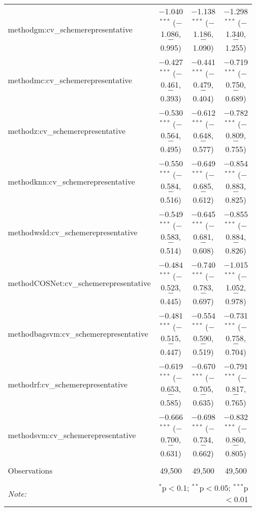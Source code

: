 \begin{table}[!htbp]
\begin{tabular}{@{\extracolsep{5pt}}lccc}
  methodgm:cv\_schemerepresentative & $-$1.040$^{***}$ ($-$1.086, $-$0.995) & $-$1.138$^{***}$ ($-$1.186, $-$1.090) & $-$1.298$^{***}$ ($-$1.340, $-$1.255) \\ 
  methodmc:cv\_schemerepresentative & $-$0.427$^{***}$ ($-$0.461, $-$0.393) & $-$0.441$^{***}$ ($-$0.479, $-$0.404) & $-$0.719$^{***}$ ($-$0.750, $-$0.689) \\ 
  methodz:cv\_schemerepresentative & $-$0.530$^{***}$ ($-$0.564, $-$0.495) & $-$0.612$^{***}$ ($-$0.648, $-$0.577) & $-$0.782$^{***}$ ($-$0.809, $-$0.755) \\ 
  methodknn:cv\_schemerepresentative & $-$0.550$^{***}$ ($-$0.584, $-$0.516) & $-$0.649$^{***}$ ($-$0.685, $-$0.612) & $-$0.854$^{***}$ ($-$0.883, $-$0.825) \\ 
  methodwsld:cv\_schemerepresentative & $-$0.549$^{***}$ ($-$0.583, $-$0.514) & $-$0.645$^{***}$ ($-$0.681, $-$0.608) & $-$0.855$^{***}$ ($-$0.884, $-$0.826) \\ 
  methodCOSNet:cv\_schemerepresentative & $-$0.484$^{***}$ ($-$0.523, $-$0.445) & $-$0.740$^{***}$ ($-$0.783, $-$0.697) & $-$1.015$^{***}$ ($-$1.052, $-$0.978) \\ 
  methodbagsvm:cv\_schemerepresentative & $-$0.481$^{***}$ ($-$0.515, $-$0.447) & $-$0.554$^{***}$ ($-$0.590, $-$0.519) & $-$0.731$^{***}$ ($-$0.758, $-$0.704) \\ 
  methodrf:cv\_schemerepresentative & $-$0.619$^{***}$ ($-$0.653, $-$0.585) & $-$0.670$^{***}$ ($-$0.705, $-$0.635) & $-$0.791$^{***}$ ($-$0.817, $-$0.765) \\ 
  methodsvm:cv\_schemerepresentative & $-$0.666$^{***}$ ($-$0.700, $-$0.631) & $-$0.698$^{***}$ ($-$0.734, $-$0.662) & $-$0.832$^{***}$ ($-$0.860, $-$0.805) \\ 
 \hline \\[-1.8ex] 
Observations & 49,500 & 49,500 & 49,500 \\ 
\hline 
\hline \\[-1.8ex] 
\textit{Note:}  & \multicolumn{3}{r}{$^{*}$p$<$0.1; $^{**}$p$<$0.05; $^{***}$p$<$0.01} \\ 
\end{tabular} 
\end{table} 
